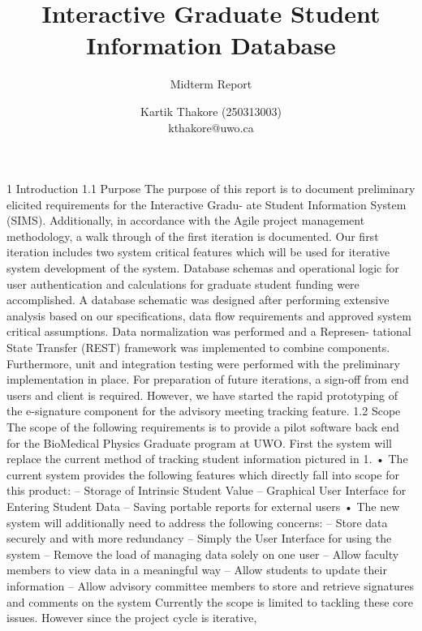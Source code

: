 \documentclass{journal}
\begin{document}

\nocite{*}
\title{Interactive Graduate Student Information Database}
\subtitle{Midterm Report} 
\author{Kartik Thakore (250313003)\\kthakore@uwo.ca}
\maketitle



1
Introduction
1.1
Purpose
The purpose of this report is to document preliminary elicited requirements for the Interactive Gradu-
ate Student Information System (SIMS). Additionally, in accordance with the Agile project management
methodology, a walk through of the first iteration is documented. Our first iteration includes two system
critical features which will be used for iterative system development of the system. Database schemas and
operational logic for user authentication and calculations for graduate student funding were accomplished.
A database schematic was designed after performing extensive analysis based on our specifications, data flow
requirements and approved system critical assumptions. Data normalization was performed and a Represen-
tational State Transfer (REST) framework was implemented to combine components. Furthermore, unit and
integration testing were performed with the preliminary implementation in place. For preparation of future
iterations, a sign-off from end users and client is required. However, we have started the rapid prototyping
of the e-signature component for the advisory meeting tracking feature.
1.2
Scope
The scope of the following requirements is to provide a pilot software back end for the BioMedical Physics
Graduate program at UWO. First the system will replace the current method of tracking student information
pictured in 1.
• The current system provides the following features which directly fall into scope for this product:
– Storage of Intrinsic Student Value
– Graphical User Interface for Entering Student Data
– Saving portable reports for external users
• The new system will additionally need to address the following concerns:
– Store data securely and with more redundancy
– Simply the User Interface for using the system
– Remove the load of managing data solely on one user
– Allow faculty members to view data in a meaningful way
– Allow students to update their information
– Allow advisory committee members to store and retrieve signatures and comments on the system
Currently the scope is limited to tackling these core issues. However since the project cycle is iterative,
\end{document}
